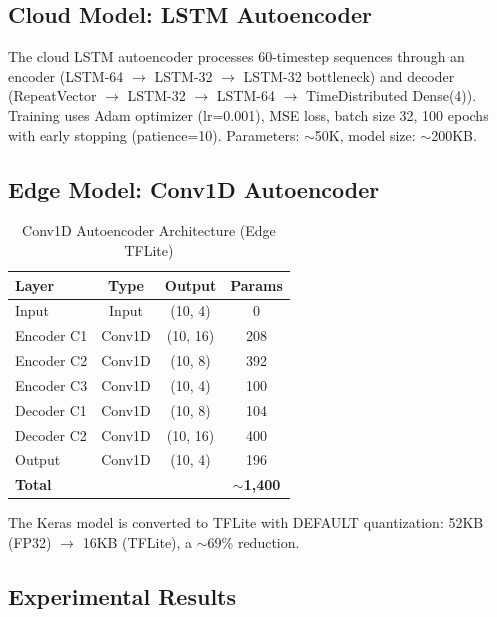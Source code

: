 \documentclass[conference]{IEEEtran}
\begin{document}
\subsection{Cloud Model: LSTM Autoencoder}
The cloud LSTM autoencoder processes 60-timestep sequences through an encoder (LSTM-64 $\rightarrow$ LSTM-32 $\rightarrow$ LSTM-32 bottleneck) and decoder (RepeatVector $\rightarrow$ LSTM-32 $\rightarrow$ LSTM-64 $\rightarrow$ TimeDistributed Dense(4)). Training uses Adam optimizer (lr=0.001), MSE loss, batch size 32, 100 epochs with early stopping (patience=10). Parameters: $\sim$50K, model size: $\sim$200KB.

\subsection{Edge Model: Conv1D Autoencoder}

\begin{table}[H]
\centering
\caption{Conv1D Autoencoder Architecture (Edge TFLite)}
\label{tab:conv1d_arch}
\begin{tabular}{lccc}
\toprule
\textbf{Layer} & \textbf{Type} & \textbf{Output} & \textbf{Params} \\
\midrule
Input & Input & (10, 4) & 0 \\
Encoder C1 & Conv1D & (10, 16) & 208 \\
Encoder C2 & Conv1D & (10, 8) & 392 \\
Encoder C3 & Conv1D & (10, 4) & 100 \\
\midrule
Decoder C1 & Conv1D & (10, 8) & 104 \\
Decoder C2 & Conv1D & (10, 16) & 400 \\
Output & Conv1D & (10, 4) & 196 \\
\midrule
\textbf{Total} & & & \textbf{$\sim$1,400} \\
\bottomrule
\end{tabular}
\end{table}

The Keras model is converted to TFLite with DEFAULT quantization: 52KB (FP32) $\rightarrow$ 16KB (TFLite), a $\sim$69\% reduction.

\subsection{Experimental Results}
\end{document}
